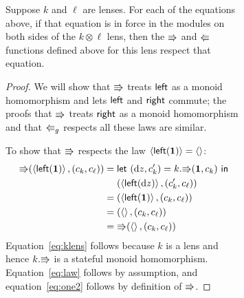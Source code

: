 \begin{figure}
\begin{figure}
\begin{lemma}
    Suppose $k$ and $\ell$ are lenses. For each of the equations above, if
    that equation is in force in the modules on both sides of the
    $k\otimes\ell$ lens, then the $\mathord{\Rrightarrow}$ and $\mathord{\Lleftarrow}$ functions defined
    above for this lens respect that equation.
\end{lemma}
\begin{proof}
We will show that $\mathord{\Rrightarrow}$ treats $\mathsf{left}$ as a monoid homomorphism and
lets $\mathsf{left}$ and $\mathsf{right}$ commute; the proofs that $\mathord{\Rrightarrow}$ treats
$\mathsf{right}$ as a monoid homomorphism and that $\mathord{\Lleftarrow}_g$ respects all these
laws are similar.

To show that $\mathord{\Rrightarrow}$ respects the law $\left<\mathsf{left}(\mbox{\bf{1}})\right>=\left<\right>$:
\begin{align}
    \mathord{\Rrightarrow}(\left<\mathsf{left}(\mbox{\bf{1}})\right>,(c_k,c_\ell))
        ={}& \mathsf{let}\  (\textrm{d} z,c_k')=k.\mathord{\Rrightarrow}(\mbox{\bf{1}},c_k)\ \mathsf{in} \nonumber\\
           & (\left<\mathsf{left}(\textrm{d} z)\right>,(c_k',c_\ell)) \nonumber\\
        ={}& (\left<\mathsf{left}(\mbox{\bf{1}})\right>,(c_k,c_\ell)) \label{eq:klens} \\
        ={}& (\left<\right>,(c_k,c_\ell)) \label{eq:law} \\
        ={}& \mathord{\Rrightarrow}(\left<\right>,(c_k,c_\ell)) \label{eq:one2}
\end{align}
Equation~\ref{eq:klens} follows because $k$ is a lens and hence $k.\mathord{\Rrightarrow}$
is a stateful monoid homomorphism. Equation~\ref{eq:law} follows by
assumption, and equation~\ref{eq:one2} follows by definition of $\mathord{\Rrightarrow}$.


\end{proof}
\end{figure}
\end{figure}

